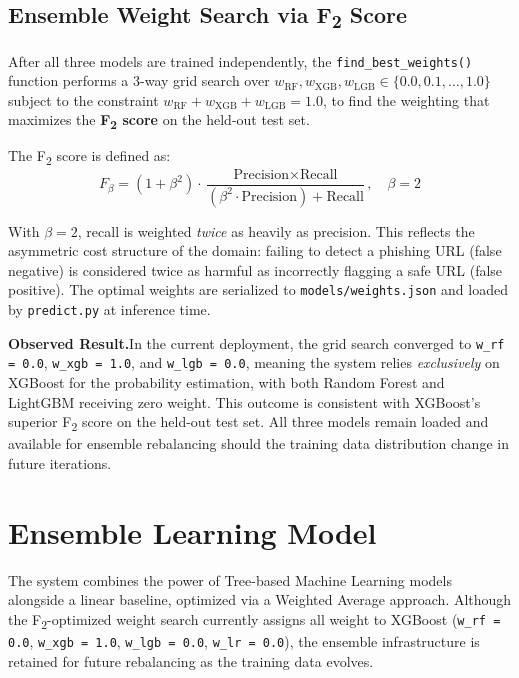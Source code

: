 \documentclass[12pt,a4paper]{article}
\begin{document}
\subsection{Ensemble Weight Search via \texorpdfstring{F\textsubscript{2}}{F2} Score}

After all three models are trained independently, the \texttt{find\_best\_weights()} function performs a 3-way grid search over $w_{\text{RF}}, w_{\text{XGB}}, w_{\text{LGB}} \in \{0.0, 0.1, \ldots, 1.0\}$ subject to the constraint $w_{\text{RF}} + w_{\text{XGB}} + w_{\text{LGB}} = 1.0$, to find the weighting that maximizes the \textbf{F\textsubscript{2} score} on the held-out test set.

The F\textsubscript{2} score is defined as:
\[
F_\beta = (1 + \beta^2) \cdot \frac{\text{Precision} \times \text{Recall}}{(\beta^2 \cdot \text{Precision}) + \text{Recall}}, \quad \beta = 2
\]

With $\beta = 2$, recall is weighted \textit{twice} as heavily as precision. This reflects the asymmetric cost structure of the domain: failing to detect a phishing URL (false negative) is considered twice as harmful as incorrectly flagging a safe URL (false positive). The optimal weights are serialized to \texttt{models/weights.json} and loaded by \texttt{predict.py} at inference time.

\textbf{Observed Result.}\quad In the current deployment, the grid search converged to \texttt{w\_rf = 0.0}, \texttt{w\_xgb = 1.0}, and \texttt{w\_lgb = 0.0}, meaning the system relies \textit{exclusively} on XGBoost for the probability estimation, with both Random Forest and LightGBM receiving zero weight. This outcome is consistent with XGBoost's superior F\textsubscript{2} score on the held-out test set. All three models remain loaded and available for ensemble rebalancing should the training data distribution change in future iterations.

\section{Ensemble Learning Model}

The system combines the power of Tree-based Machine Learning models alongside a linear baseline, optimized via a Weighted Average approach. Although the F\textsubscript{2}-optimized weight search currently assigns all weight to XGBoost (\texttt{w\_rf = 0.0}, \texttt{w\_xgb = 1.0}, \texttt{w\_lgb = 0.0}, \texttt{w\_lr = 0.0}), the ensemble infrastructure is retained for future rebalancing as the training data evolves.
\end{document}
